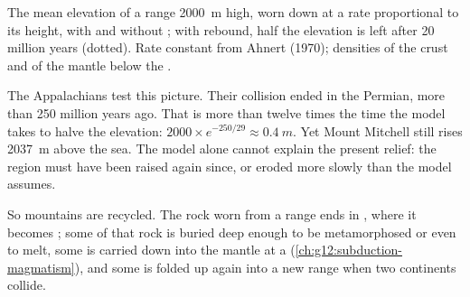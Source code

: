 \begin{omfigure}

{\small The mean elevation of a range \qty{2000}{m} high, worn down at a rate
proportional to its height, with and without ; with
rebound, half the elevation is left after 20 million years (dotted). Rate
constant from Ahnert (1970); densities of the crust and of the mantle below
the .}
\end{omfigure}

The Appalachians test this picture. Their collision ended in the Permian,
more than 250 million years ago. That is more than twelve times the time the
model takes to halve the elevation: $2000 \times e^{-250/29} \approx
\qty{0.4}{m}$. Yet Mount Mitchell still rises \qty{2037}{m} above the sea.
The model alone cannot explain the present relief: the region must have been
raised again since, or eroded more slowly than the model assumes.

So mountains are recycled. The rock worn from a range ends in , where it becomes ; some of that rock is buried deep
enough to be metamorphosed or even to melt, some is carried down into the
mantle at a  (\cref{ch:g12:subduction-magmatism}), and some is
folded up again into a new range when two continents collide.

